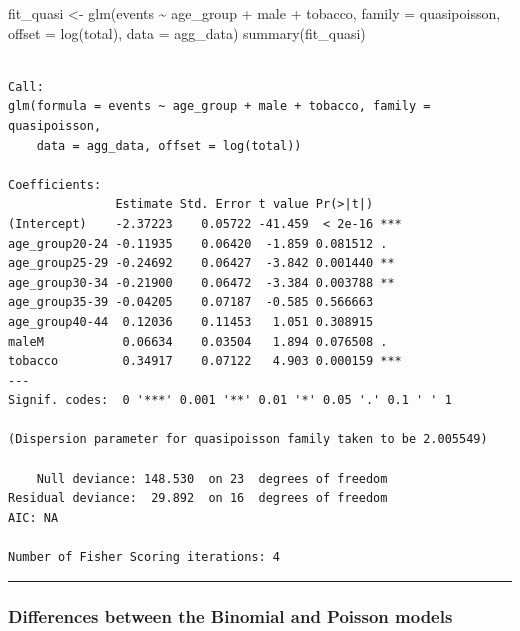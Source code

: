 \documentclass[
  letterpaper,
  DIV=11,
  numbers=noendperiod]{scrreprt}
\newenvironment{Shaded}{\begin{snugshade}}{\end{snugshade}}
\newcommand{\AttributeTok}[1]{\textcolor[rgb]{0.40,0.45,0.13}{#1}}
\newcommand{\FunctionTok}[1]{\textcolor[rgb]{0.28,0.35,0.67}{#1}}
\newcommand{\NormalTok}[1]{\textcolor[rgb]{0.00,0.23,0.31}{#1}}
\newcommand{\OtherTok}[1]{\textcolor[rgb]{0.00,0.23,0.31}{#1}}
\newcommand{\SpecialCharTok}[1]{\textcolor[rgb]{0.37,0.37,0.37}{#1}}
\begin{document}
\begin{Shaded}
\begin{Highlighting}[]
\NormalTok{fit\_quasi }\OtherTok{\textless{}{-}} \FunctionTok{glm}\NormalTok{(events }\SpecialCharTok{\textasciitilde{}}\NormalTok{ age\_group }\SpecialCharTok{+}\NormalTok{ male }\SpecialCharTok{+}\NormalTok{ tobacco,}
                 \AttributeTok{family =}\NormalTok{ quasipoisson,}
                 \AttributeTok{offset =} \FunctionTok{log}\NormalTok{(total),}
                 \AttributeTok{data =}\NormalTok{ agg\_data)}
\FunctionTok{summary}\NormalTok{(fit\_quasi)}
\end{Highlighting}
\end{Shaded}

\begin{verbatim}

Call:
glm(formula = events ~ age_group + male + tobacco, family = quasipoisson, 
    data = agg_data, offset = log(total))

Coefficients:
               Estimate Std. Error t value Pr(>|t|)    
(Intercept)    -2.37223    0.05722 -41.459  < 2e-16 ***
age_group20-24 -0.11935    0.06420  -1.859 0.081512 .  
age_group25-29 -0.24692    0.06427  -3.842 0.001440 ** 
age_group30-34 -0.21900    0.06472  -3.384 0.003788 ** 
age_group35-39 -0.04205    0.07187  -0.585 0.566663    
age_group40-44  0.12036    0.11453   1.051 0.308915    
maleM           0.06634    0.03504   1.894 0.076508 .  
tobacco         0.34917    0.07122   4.903 0.000159 ***
---
Signif. codes:  0 '***' 0.001 '**' 0.01 '*' 0.05 '.' 0.1 ' ' 1

(Dispersion parameter for quasipoisson family taken to be 2.005549)

    Null deviance: 148.530  on 23  degrees of freedom
Residual deviance:  29.892  on 16  degrees of freedom
AIC: NA

Number of Fisher Scoring iterations: 4
\end{verbatim}

\begin{center}\rule{0.5\linewidth}{0.5pt}\end{center}

\hypertarget{differences-between-the-binomial-and-poisson-models}{%
\subsubsection*{Differences between the Binomial and Poisson
models}\label{differences-between-the-binomial-and-poisson-models}}
\end{document}
